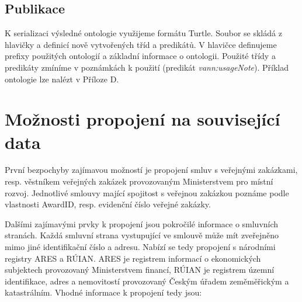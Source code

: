 \subsection{Publikace}
\label{sec:kap423}

K serializaci výsledné ontologie využijeme formátu Turtle. Soubor se skládá z hlavičky a definicí nově vytvořených tříd a predikátů. V hlavičce definujeme prefixy použitých ontologií a základní informace o ontologii. Použité třídy a predikáty zmíníme v poznámkách k použití (predikát \textit{vann:usageNote}). Příklad ontologie lze nalézt v Příloze D.

\newpage

\section{Možnosti propojení na související data}

První bezpochyby zajímavou možností je propojení smluv s veřejnými zakázkami, resp. věstníkem veřejných zakázek provozovaným Ministerstvem pro místní rozvoj. Jednotlivé smlouvy mající spojitost s veřejnou zakázkou poznáme podle vlastnosti AwardID, resp. evidenční číslo veřejné zakázky.  

Dalšími zajímavými prvky k propojení jsou pokročilé informace o smluvních stranách. Každá smluvní strana vystupující ve smlouvě může mít zveřejněno mimo jiné identifikační číslo a adresu. Nabízí se tedy propojení s národními registry ARES a RÚIAN. ARES je registrem informací o ekonomických subjektech provozovaný Ministerstvem financí, RÚIAN je registrem územní identifikace, adres a nemovitostí provozovaný Českým úřadem zeměměřickým a katastrálním. Vhodné informace k propojení tedy jsou:

